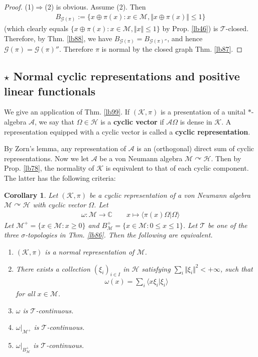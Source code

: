 \documentclass[12pt,b5paper,notitlepage]{article}
\theoremstyle{definition}
\theoremstyle{plain}
\newtheorem{co}[df]{Corollary}
\newcommand{\mc}{\mathcal}
\newcommand{\bk}[1]{\langle {#1}\rangle}
\newcommand{\scr}{\mathscr}
\newcommand{\Cbb}{\mathbb C}
\numberwithin{equation}{section}
\begin{document}
\begin{proof}
(1)$\Rightarrow$(2) is obvious. Assume (2). Then
\begin{align*}
B_{\scr G(\pi)}:=\{x\oplus\pi(x):x\in\mc M,\Vert x\oplus\pi(x)\Vert\leq1\}
\end{align*}
(which clearly equals $\{x\oplus\pi(x):x\in\mc M,\Vert x\Vert\leq1\}$ by Prop. \ref{lb46}) is $\mc T$-closed. Therefore, by Thm. \ref{lb88}, we have $B_{\scr G(\pi)}=B_{\scr G(\pi)''}$, and hence $\scr G(\pi)=\scr G(\pi)''$. Therefore $\pi$ is normal by the closed graph Thm. \ref{lb87}.
\end{proof}



\subsection*{$\star$ Normal cyclic representations and positive linear functionals}

We give an application of Thm. \ref{lb99}. If $(\mc K,\pi)$ is a presentation of a unital $*$-algebra $\scr A$, we say that $\Omega\in\mc H$ is a \textbf{cyclic vector} if $\scr A\Omega$ is dense in $\mc K$. A representation equipped with a cyclic vector is called a \textbf{cyclic representation}. 

By Zorn's lemma, any representation of $\scr A$ is an (orthogonal) direct sum of cyclic representations. Now we let $\scr A$ be a von Neumann algebra $\mc M\curvearrowright\mc H$. Then by Prop. \ref{lb78}, the normality of $\mc K$ is equivalent to that of each cyclic component. The latter has the following criteria:


\begin{co}\label{lb102}
Let $(\mc K,\pi)$ be a cyclic representation of a von Neumann algebra $\mc M\curvearrowright\mc H$ with cyclic vector $\Omega$. Let
\begin{align}
\omega:\mc M\rightarrow\Cbb\qquad x\mapsto\bk{\pi(x)\Omega|\Omega}\label{eq37}
\end{align}
Let $\mc M^+=\{x\in\mc M:x\geq0\}$ and $B^+_{\mc M}=\{x\in\mc M:0\leq x\leq 1\}$. Let $\mc T$ be one of the three $\sigma$-topologies in Thm. \ref{lb86}. Then the following are equivalent.
\begin{enumerate}[label=(\arabic*)]
\item $(\mc K,\pi)$ is a normal representation of $\mc M$.
\item There exists a collection $(\xi_i)_{i\in I}$ in $\mc H$ satisfying $\sum_i\Vert\xi_i\Vert^2<+\infty$, such that  
\begin{align*}
\omega(x)=\sum_i \bk{x\xi_i|\xi_i}
\end{align*}
for all $x\in\mc M$.
\item $\omega$ is $\mc T$-continuous.
\item $\omega|_{\mc M^+}$ is $\mc T$-continuous.
\item $\omega|_{B^+_{\mc M}}$ is $\mc T$-continuous.
\end{enumerate}
\end{co}
\end{document}
